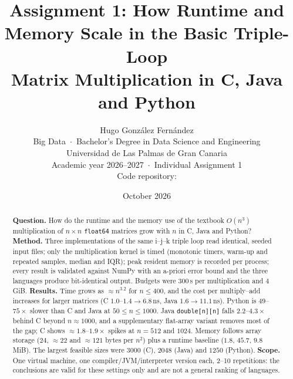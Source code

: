 \documentclass[10pt,a4paper]{article}
\title{\textbf{Assignment 1: How Runtime and Memory Scale in the Basic Triple-Loop\\Matrix Multiplication in C, Java and Python}}
\author{Hugo Gonz\'alez Fern\'andez\\[2pt]
Big Data \,$\cdot$\, Bachelor’s Degree in Data Science and Engineering\\
Universidad de Las Palmas de Gran Canaria\\
Academic year 2026--2027 \,$\cdot$\, Individual Assignment 1\\[4pt]
Code repository: \repourl}
\date{October 2026}
\begin{document}
\maketitle

\begin{abstract}
\noindent\textbf{Question.} How do the runtime and the memory use of the textbook $O(n^3)$ multiplication of $n\times n$ \texttt{float64}
matrices grow with $n$ in C, Java and Python? \textbf{Method.} Three implementations of the same i--j--k triple loop read identical, seeded input
files; only the multiplication kernel is timed (monotonic timers, warm-up and repeated samples, median and IQR); peak resident memory is recorded per process;
every result is validated against NumPy with an a-priori error bound and the three languages produce bit-identical output. Budgets were $300$\,s per multiplication and $4$\,GiB.
\textbf{Results.} Time grows as $\approx n^{3.2}$ for $n\le400$, and the cost per multiply--add increases for larger matrices (C $1.0$--$1.4\to6.8$\,ns, Java $1.6\to11.1$\,ns).
Python is $49$--$75\times$ slower than C and Java at $50\le n\le1000$. Java \texttt{double[n][n]} falls $2.2$--$4.3\times$ behind C beyond $n\approx1000$,
and a supplementary flat-array variant removes most of the gap; C shows $\approx1.8$--$1.9\times$ spikes at $n=512$ and $1024$. Memory follows array storage ($24$, $\approx22$ and $\approx121$ bytes per $n^2$)
plus a runtime baseline ($1.8$, $45.7$, $9.8$\,MiB). The largest feasible sizes were $3000$ (C), $2048$ (Java) and $1250$ (Python).
\textbf{Scope.} One virtual machine, one compiler/JVM/interpreter version each, 2--10 repetitions: the conclusions are valid for these settings only and are not a general ranking of languages.
\end{abstract}




\end{document}
